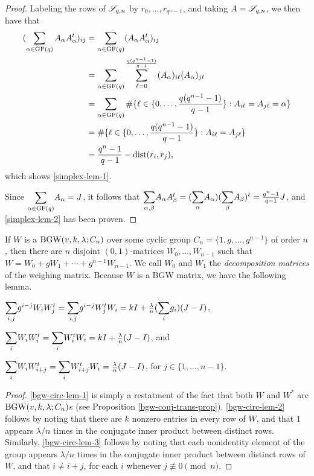 \documentclass[../../../main]{subfiles}
\begin{document}
 \begin{proof}
  Labeling the rows of $\mathscr{S}_{q,n}$ by $r_0,\dots,r_{q^n-1}$, and taking $A=\mathscr{S}_{q,n}$, we then have that
  \begin{align*}
   (\sum_{\alpha\in\text{GF}(q)} A_\alpha A_\alpha^t)_{ij} &= \sum_{\alpha\in\text{GF}(q)}(A_\alpha A_\alpha^t)_{ij} \\
   &= \sum_{\alpha\in\text{GF}(q)} \sum_{\ell=0}^{\frac{q(q^{n-1}-1)}{q-1}}(A_\alpha)_{i\ell}(A_\alpha)_{j\ell} \\
   &= \sum_{\alpha\in\text{GF}(q)} \#\{\ell \in \{0,\dots,\frac{q(q^{n-1}-1)}{q-1}\} : A_{i\ell}=A_{j\ell}=\alpha\} \\
   &= \#\{\ell \in \{0,\dots,\frac{q(q^{n-1}-1)}{q-1}\} : A_{i\ell}=A_{j\ell}\} \\
   &= \frac{q^n-1}{q-1} - \text{dist}(r_i,r_j),
  \end{align*}
  which shows \ref{simplex-lem-1}.
  
  Since $\ssum_{\alpha\in\gf(q)}A_\alpha=J$, it follows that $\ssum_{\alpha,\beta}A_\alpha A_\beta^t = (\ssum_\alpha A_\alpha)(\ssum_\beta A_\beta)^t = \frac{q^n-1}{q-1}J$, and \ref{simplex-lem-2} has been proven.
 \end{proof}
 
 If $W$ is a $\text{BGW}(v,k,\lambda;C_n)$ over some cyclic group $C_n=\{1,g,\dots,g^{n-1}\}$ of order $n$, then there are $n$ disjoint $(0,1)$-matrices $W_0, \dots, W_{n-1}$ such that $W=W_0 + gW_1 + \cdots + g^{n-1}W_{n-1}$. We call $W_0$ and $W_1$ the {\it decomposition matrices} of the weighing matrix. Because $W$ is a BGW matrix, we have the following lemma.
 
 \begin{lem}\label{bgw-circ-lem}
  \begin{defenum}
   \item[]
   \item\label{bgw-circ-lem-1} $\ssum_{i,j}g^{i-j}W_iW_j^t = \ssum_{i,j}g^{i-j}W_j^tW_i = kI + \frac{\lambda}{n}(\ssum_ig_i)(J-I)$,
   \item\label{bgw-circ-lem-2} $\ssum_iW_iW_i^t = \ssum_iW_i^tW_i = kI +\frac{\lambda}{n}(J-I)$, and
   \item\label{bgw-circ-lem-3} $\ssum_iW_iW_{i+j}^t = \ssum_iW_{i+j}^tW_i = \frac{\lambda}{n}(J-I)$, for $j \in \{1,\dots,n-1\}$.
  \end{defenum}
 \end{lem}

 \begin{proof}
  \ref{bgw-circ-lem-1} is simply a restatment of the fact that both $W$ and $W^*$ are $\text{BGW}(v,k,\lambda;C_n)$s (see Proposition \ref{bgw-conj-trans-prop}). \ref{bgw-circ-lem-2} follows by noting that there are $k$ nonzero entries in every row of $W$, and that $1$ appears $\lambda/n$ times in the conjugate inner product between distinct rows. Similarly, \ref{bgw-circ-lem-3} follows by noting that each nonidentity element of the group appears $\lambda/n$ times in the conjugate inner product between distinct rows of $W$, and that $i \neq i+j$, for each $i$ whenever $j \not\equiv 0 \pmod{n}$.
 \end{proof}
\end{document}

